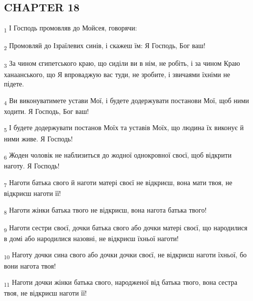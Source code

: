 \subsection{CHAPTER 18}
\begin{tcolorbox}
\textsubscript{1} І Господь промовляв до Мойсея, говорячи:
\end{tcolorbox}
\begin{tcolorbox}
\textsubscript{2} Промовляй до Ізраїлевих синів, і скажеш їм: Я Господь, Бог ваш!
\end{tcolorbox}
\begin{tcolorbox}
\textsubscript{3} За чином єгипетського краю, що сиділи ви в нім, не робіть, і за чином Краю ханаанського, що Я впроваджую вас туди, не зробите, і звичаями їхніми не підете.
\end{tcolorbox}
\begin{tcolorbox}
\textsubscript{4} Ви виконуватимете устави Мої, і будете додержувати постанови Мої, щоб ними ходити. Я Господь, Бог ваш!
\end{tcolorbox}
\begin{tcolorbox}
\textsubscript{5} І будете додержувати постанов Моїх та уставів Моїх, що людина їх виконує й ними живе. Я Господь!
\end{tcolorbox}
\begin{tcolorbox}
\textsubscript{6} Жоден чоловік не наблизиться до жодної однокровної своєї, щоб відкрити наготу. Я Господь!
\end{tcolorbox}
\begin{tcolorbox}
\textsubscript{7} Наготи батька свого й наготи матері своєї не відкриєш, вона мати твоя, не відкриєш наготи її!
\end{tcolorbox}
\begin{tcolorbox}
\textsubscript{8} Наготи жінки батька твого не відкриєш, вона нагота батька твого!
\end{tcolorbox}
\begin{tcolorbox}
\textsubscript{9} Наготи сестри своєї, дочки батька свого або дочки матері своєї, що народилися в домі або народилися назовні, не відкриєш їхньої наготи!
\end{tcolorbox}
\begin{tcolorbox}
\textsubscript{10} Наготу дочки сина свого або дочки дочки своєї, не відкриєш наготи їхньої, бо вони нагота твоя!
\end{tcolorbox}
\begin{tcolorbox}
\textsubscript{11} Наготи дочки жінки батька свого, народженої від батька твого, вона сестра твоя, не відкриєш наготи її!
\end{tcolorbox}
